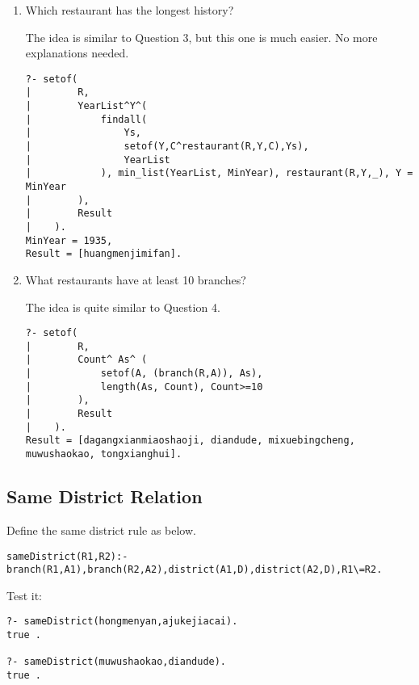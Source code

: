 ﻿\documentclass[a4paper, 11pt]{article}
\begin{document}
\begin{enumerate}
\item Which restaurant has the longest history?

The idea is similar to Question 3, but this one is much easier. No more explanations needed.
\begin{lstlisting}
?- setof(
|        R,
|        YearList^Y^(
|            findall(
|                Ys,
|                setof(Y,C^restaurant(R,Y,C),Ys),
|                YearList
|            ), min_list(YearList, MinYear), restaurant(R,Y,_), Y = MinYear
|        ),
|        Result
|    ).
MinYear = 1935,
Result = [huangmenjimifan].
\end{lstlisting}


\item What restaurants have at least 10 branches?

The idea is quite similar to Question 4.
\begin{lstlisting}
?- setof(
|        R,
|        Count^ As^ (
|            setof(A, (branch(R,A)), As),
|            length(As, Count), Count>=10
|        ),
|        Result
|    ).
Result = [dagangxianmiaoshaoji, diandude, mixuebingcheng, muwushaokao, tongxianghui].
\end{lstlisting}

\end{enumerate}

\subsection{Same District Relation}

Define the same district rule as below.
\begin{lstlisting}
sameDistrict(R1,R2):-branch(R1,A1),branch(R2,A2),district(A1,D),district(A2,D),R1\=R2.
\end{lstlisting}

Test it:
\begin{lstlisting}
?- sameDistrict(hongmenyan,ajukejiacai).
true .

?- sameDistrict(muwushaokao,diandude).
true .
\end{lstlisting}
\end{document}

